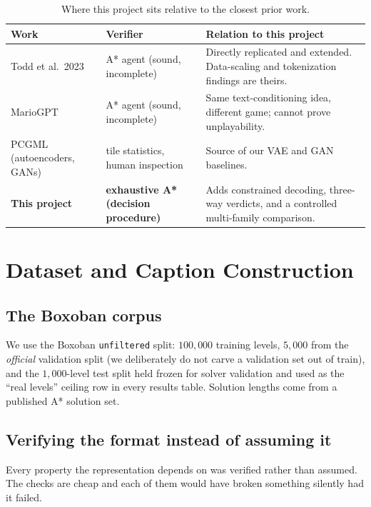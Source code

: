\documentclass[11pt,a4paper]{report}
\begin{document}
\begin{table}[!htb]
\centering\small
\caption{Where this project sits relative to the closest prior work.}
\label{tab:lit}
\begin{tabularx}{\textwidth}{@{}l l X@{}}
\toprule
\textbf{Work} & \textbf{Verifier} & \textbf{Relation to this project} \\
\midrule
Todd et al.\ 2023 & A* agent (sound, incomplete) &
Directly replicated and extended. Data-scaling and tokenization findings are
theirs. \\
MarioGPT & A* agent (sound, incomplete) &
Same text-conditioning idea, different game; cannot prove unplayability. \\
PCGML (autoencoders, GANs) & tile statistics, human inspection &
Source of our VAE and GAN baselines. \\
\textbf{This project} & \textbf{exhaustive A* (decision procedure)} &
Adds constrained decoding, three-way verdicts, and a controlled multi-family
comparison. \\
\bottomrule
\end{tabularx}
\end{table}

\chapter{Dataset and Caption Construction}
\label{ch:data}

\section{The Boxoban corpus}

We use the Boxoban \texttt{unfiltered} split: $100{,}000$ training levels,
$5{,}000$ from the \emph{official} validation split (we deliberately do not
carve a validation set out of train), and the $1{,}000$-level test split held
frozen for solver validation and used as the ``real levels'' ceiling row in
every results table. Solution lengths come from a published A* solution set.

\section{Verifying the format instead of assuming it}

Every property the representation depends on was verified rather than assumed.
The checks are cheap and each of them would have broken something silently had
it failed.
\end{document}
